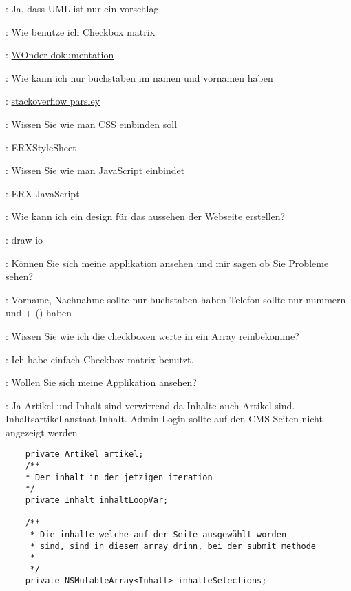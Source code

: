 \documentclass[a4paper, 11pt]{article}
\begin{document}
\begin{drama}
\dozentspeaks: Ja, dass UML ist nur ein vorschlag

\msspeaks: Wie benutze ich Checkbox matrix

\internetspeaks: \href{https://github.com/wocommunity/wonder/blob/4d7f6bf9236c3005359101d6f3c9e6224d47750e/Frameworks/Core/JavaWOExtensions/Sources/com/webobjects/woextensions/WOCheckboxMatrix.java}{WOnder dokumentation}

\msspeaks: Wie kann ich nur buchstaben im namen und vornamen haben

\internetspeaks: \href{https://stackoverflow.com/questions/23415795/how-to-only-allow-text-in-parsely-js-validation}{stackoverflow parsley}

\msspeaks: Wissen Sie wie man CSS einbinden soll

\lucasspeaks: ERXStyleSheet

\msspeaks: Wissen Sie wie man JavaScript einbindet

\lucasspeaks: ERX JavaScript

\msspeaks: Wie kann ich ein design für das aussehen der Webseite erstellen?

\lucasspeaks: draw io

\msspeaks: Können Sie sich meine applikation ansehen und mir sagen ob Sie Probleme sehen?

\lucasspeaks:
    Vorname, Nachnahme sollte nur buchstaben haben
    Telefon sollte nur nummern und + () haben

\msspeaks: Wissen Sie wie ich die checkboxen werte in ein Array reinbekomme?

\standhardspeaks: Ich habe einfach Checkbox matrix benutzt.

\msspeaks: Wollen Sie sich meine Applikation ansehen?

\fuscospeaks: Ja
    Artikel und Inhalt sind verwirrend da Inhalte auch Artikel sind. Inhaltsartikel anstaat Inhalt.
    Admin Login sollte auf den CMS Seiten nicht angezeigt werden

\end{drama}

\begin{verbatim}
	private Artikel artikel;
	/**
	* Der inhalt in der jetzigen iteration
	*/
	private Inhalt inhaltLoopVar;
	
	/**
	 * Die inhalte welche auf der Seite ausgewählt worden
	 * sind, sind in diesem array drinn, bei der submit methode
	 * 
	 */
	private NSMutableArray<Inhalt> inhalteSelections;
	\end{verbatim}
\end{document}
